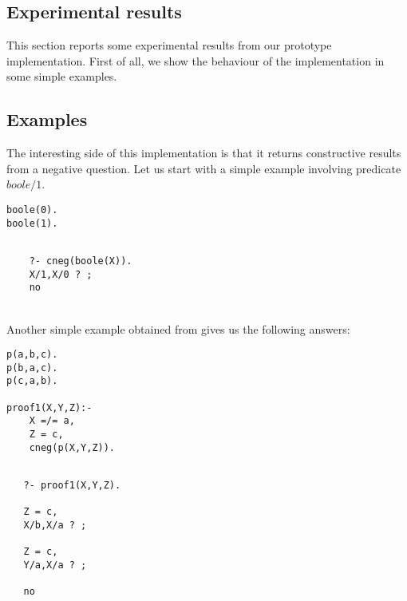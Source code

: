 \documentclass{llncs}
\begin{document}
\subsection{Experimental results}
\label{results}
This section reports some experimental results from our prototype
implementation.  First of all, we show the behaviour of the
implementation in some simple examples.


\subsection{Examples}
\label{examples}

The interesting side of this implementation is that it returns
constructive results from a negative question. Let us start with a
simple example involving predicate $boole/1$.

\begin{minipage}{2in}
\begin{verbatim}
boole(0).
boole(1).
\end{verbatim}
\end{minipage}
\begin{minipage}{2in}
\begin{verbatim} 

    ?- cneg(boole(X)).
    X/1,X/0 ? ;
    no
\end{verbatim} 
\end{minipage}\\

Another simple example obtained from \cite{Stuckey95} gives us the
following answers:

\begin{minipage}{2in}
\begin{verbatim}
p(a,b,c).
p(b,a,c).
p(c,a,b).

proof1(X,Y,Z):-
    X =/= a,
    Z = c,
    cneg(p(X,Y,Z)).
\end{verbatim}
\end{minipage}
\begin{minipage}{2in}
\begin{verbatim} 

   ?- proof1(X,Y,Z).

   Z = c,
   X/b,X/a ? ;

   Z = c,
   Y/a,X/a ? ;

   no
\end{verbatim} 
\end{minipage}\\
\end{document}
